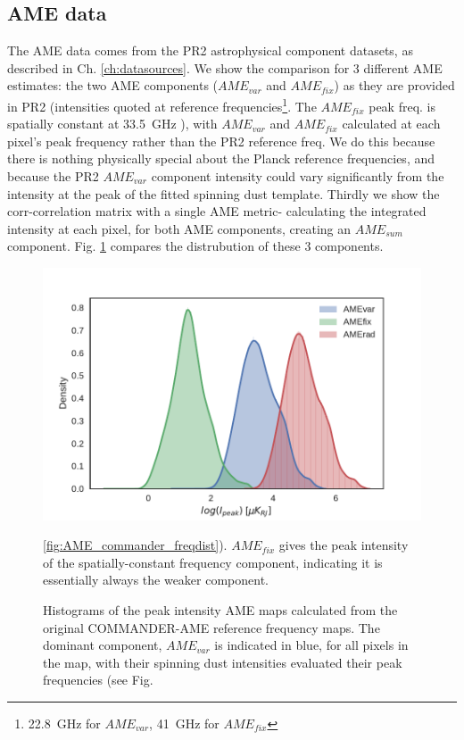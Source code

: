       \subsection{AME data}
         The AME data comes from the PR2 astrophysical component datasets, as described in Ch. \ref{ch:datasources}. We show the comparison for 3 different AME estimates: the two AME components ($AME_{var}$ and $AME_{fix}$) as they are provided in PR2 (intensities quoted at reference frequencies\footnote{22.8~GHz for $AME_{var}$, 41~GHz for $AME_{fix}$}. The  $AME_{fix}$ peak freq. is spatially constant at 33.5~GHz ), with $AME_{var}$ and $AME_{fix}$ calculated at each pixel's peak frequency rather than the PR2 reference freq. We do this because there is nothing physically special about the Planck reference frequencies, and because the PR2 $AME_{var}$ component intensity could vary significantly from the intensity at the peak of the fitted spinning dust template. Thirdly we show the corr-correlation matrix with a single AME metric- calculating the integrated intensity at each pixel, for both AME components, creating an $AME_{sum}$ component. Fig. \ref{fig:AME_comps_distplot} compares the distrubution of these 3 components.
         \begin{figure}
          \includegraphics[width=\textwidth]{../Plots/ch_allsky/AME_comps_distplot.pdf}
          \centering
          \caption{Histograms of the peak intensity AME maps calculated from the original COMMANDER-AME reference frequency maps. The dominant component, $AME_{var}$ is indicated in blue, for all pixels in the map, with their spinning dust intensities evaluated their peak frequencies (see Fig.} \ref{fig:AME_commander_freqdist}).  $AME_{fix}$ gives the peak intensity of the spatially-constant frequency component, indicating it is essentially always the weaker component.
          \label{fig:AME_comps_distplot}
         \end{figure}

